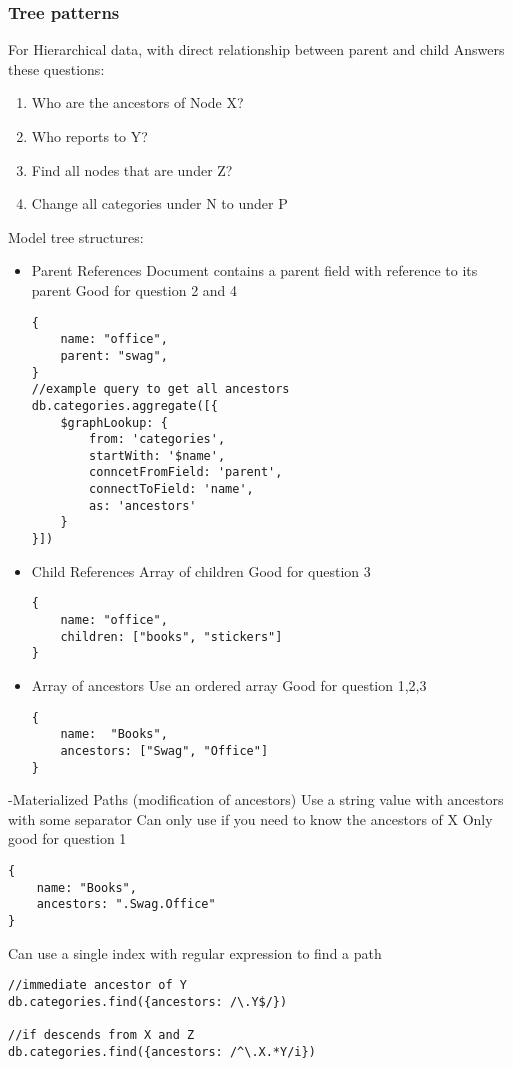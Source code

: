 \documentclass[11pt]{article}
\begin{document}
\subsubsection{Tree patterns}
\label{sec:orgbfd4218}
For Hierarchical data, with direct relationship between parent and child
Answers these questions:
\begin{enumerate}
\item Who are the ancestors of Node X?
\item Who reports to Y?
\item Find all nodes that are under Z?
\item Change all categories under N to under P
\end{enumerate}

Model tree structures:
\begin{itemize}
\item Parent References
Document contains a parent field with reference to its parent
Good for question 2 and 4
\begin{verbatim}
{
    name: "office",
    parent: "swag",
}
//example query to get all ancestors
db.categories.aggregate([{
    $graphLookup: {
        from: 'categories',
        startWith: '$name',
        conncetFromField: 'parent',
        connectToField: 'name',
        as: 'ancestors'
    }
}])

\end{verbatim}
\item Child References
Array of children
Good for question 3
\begin{verbatim}
{
    name: "office",
    children: ["books", "stickers"]
}
\end{verbatim}
\item Array of ancestors
Use an ordered array
Good for question 1,2,3
\begin{verbatim}
{
    name:  "Books",
    ancestors: ["Swag", "Office"]
}
\end{verbatim}
\end{itemize}
-Materialized Paths (modification of ancestors)
 Use a string value with ancestors with some separator
 Can only use if you need to know the ancestors of X
 Only good for question 1
\begin{verbatim}
{
    name: "Books",
    ancestors: ".Swag.Office"
}
\end{verbatim}

Can use a single index with regular expression to find a path
\begin{verbatim}
//immediate ancestor of Y
db.categories.find({ancestors: /\.Y$/})

//if descends from X and Z
db.categories.find({ancestors: /^\.X.*Y/i})
\end{verbatim}
\end{document}

